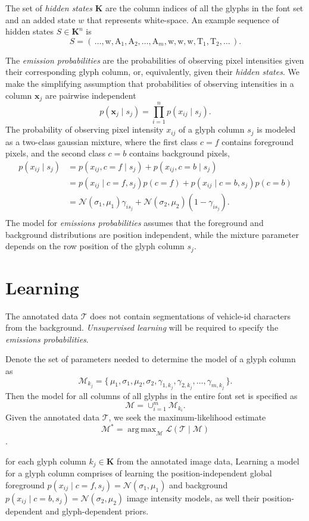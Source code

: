 \documentclass[a4paper,12pt]{article}
\newcommand{\lhood}{\ensuremath{\mathcal{L}}}
\newcommand{\truth}{\ensuremath{\mathcal{T}}}
\newcommand{\model}{\ensuremath{\mathcal{M}}}
\newcommand{\optmodel}{\ensuremath{\mathcal{M}^*}}
\DeclareMathOperator*{\argmax}{arg\,max}
\begin{document}
The set of \emph{hidden states} $\mathbf{K}$ are the column indices of
all the glyphs in the font set and an added state $w$ that represents
white-space. An example sequence of hidden states $S \in \mathbf{K}^n$
is
\[S =
\left(\,\dots,\text{w},\text{A}_1,\text{A}_2,\ldots,\text{A}_{m},\text{w},\text{w},\text{w},\text{T}_1,\text{T}_2,\ldots\,\right).\]

The \emph{emission probabilities} are the probabilities of observing
pixel intensities given their corresponding glyph column, or,
equivalently, given their \emph{hidden states}. We make the
simplifying assumption that probabilities of observing intensities in
a column $\mathbf{x}_j$ are pairwise independent \[p(\mathbf{x}_j \mid
s_j) = \prod_{i=1}^np(x_{ij} \mid s_j).\] The probability of observing
pixel intensity $x_{ij}$ of a glyph column $s_j$ is modeled as a
two-class gaussian mixture, where the first class $c=f$ contains
foreground pixels, and the second class $c=b$ contains background
pixels,
\begin{align*}
  p(x_{ij} \mid s_j) &= p(x_{ij},c=f \mid s_j)+p(x_{ij},c=b \mid s_j)\\
  &= p(x_{ij}\mid c=f,s_j)p(c=f)+p(x_{ij} \mid c=b,s_j)p(c=b) \\
  &=
  \mathcal{N}(\sigma_1,\mu_1)\gamma_{is_j}+\mathcal{N}(\sigma_2,\mu_2)(1-\gamma_{is_j}). \\
\end{align*}
The model for \emph{emissions probabilities} assumes that the
foreground and background distributions are position independent,
while the mixture parameter depends on the row position of the glyph
column $s_j$.

\section{Learning}
The annotated data $\truth$ does not contain segmentations of
vehicle-id characters from the background.  \emph{Unsupervised
  learning} will be required to specify the \emph{emissions
  probabilities}.  

Denote the set of parameters needed to determine the model of a glyph
column as
\[\model_{k_j}=\{\,\mu_1,\sigma_1,\mu_2,\sigma_2,\gamma_{1,k_j},\gamma_{2,k_j},\ldots,\gamma_{m,k_j}\,\}.\]
Then the model for all columns of all glyphs in the entire font set is
specified as
\[
\model = \cup_{i=1}^m\model_{k_i}.
\]
Given the annotated data $\truth$, we seek the maximum-likelihood
estimate \[ \optmodel = \argmax_{\model} \lhood(\truth \mid \model)\].



for each glyph column $k_j \in \mathbf{K}$ from the annotated image
data, Learning a model for a glyph column comprises of learning the
position-independent global foreground $ p(x_{ij}\mid
c=f,s_j)=\mathcal{N}(\sigma_1,\mu_1)$ and background $p(x_{ij} \mid
c=b,s_j)=\mathcal{N}(\sigma_2,\mu_2)$ image intensity models, as well
their position-dependent and glyph-dependent priors.

%
%
%
%
\end{document}
